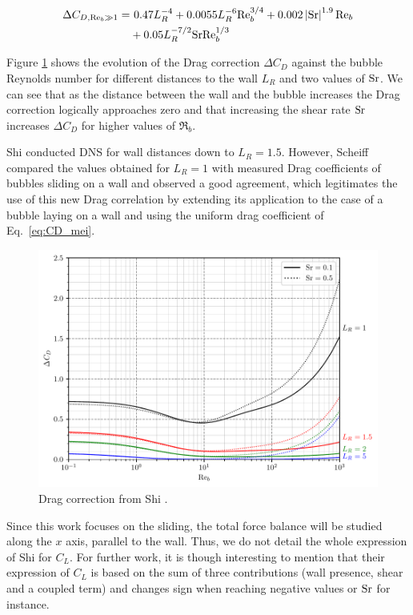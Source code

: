 \begin{align}
\nonumber \Delta C_{D,{\Re_{b}\gg 1}} =& ~0.47L_{R}^{-4}+0.0055L_{R}^{-6}\Re_{b}^{3/4} 
+0.002 \bars{\mathrm{Sr}}^{1.9} \Re_{b} \\
%
&+ 0.05 L_{R}^{-7/2} \mathrm{Sr} \Re_{b}^{1/3}
\end{align}


Figure \ref{fig:CD_shi} shows the evolution of the Drag correction $\Delta C_{D}$ against the bubble Reynolds number for different distances to the wall $L_{R}$ and two values of $\mathrm{Sr}$.  We can see that as the distance between the wall and the bubble increases the Drag correction logically approaches zero and that increasing the shear rate $\mathrm{Sr}$ increases $\Delta C_{D}$ for higher values of $\Re_{b}$.


Shi \etal \cite{shi_drag_2021} conducted DNS for wall distances down to $L_{R}=1.5$. However, Scheiff \etal \cite{scheiff_experimental_2021} compared the values obtained for $L_{R}=1$  with measured Drag coefficients of bubbles sliding on a wall and observed a good agreement, which legitimates the use of this new Drag correlation by extending its application to the case of a bubble laying on a wall and using the uniform drag coefficient of Eq.~\ref{eq:CD_mei}.




\begin{figure}[h!]
\centering
\includegraphics[width=0.8\linewidth]{img/forces/corr_drag.pdf}
\caption{Drag correction from Shi \etal \cite{shi_drag_2021}.}
\label{fig:CD_shi}
\end{figure}


\npar

Since this work focuses on the sliding, the total force balance will be studied along the $x$ axis, parallel to the wall. Thus, we do not detail the whole expression of Shi \etal for $C_{L}$. For further work, it is though interesting to mention that their expression of $C_{L}$ is based on the sum of three contributions (wall presence, shear and a coupled term) and changes sign when reaching negative values or $\mathrm{Sr}$ for instance.





